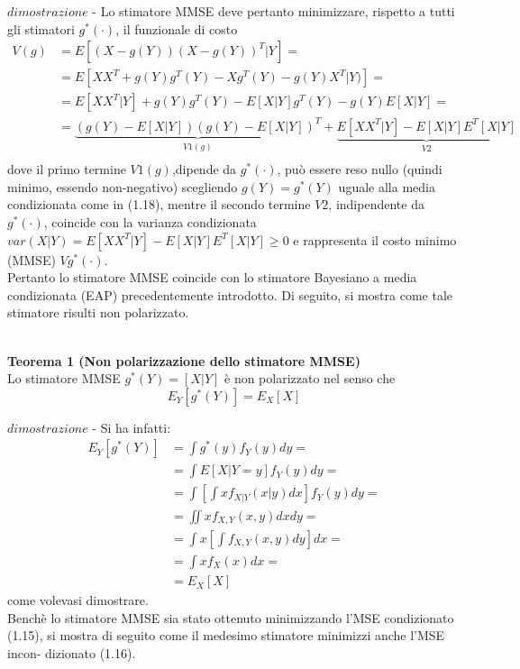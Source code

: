 $dimostrazione$ - Lo stimatore MMSE deve pertanto minimizzare, rispetto a tutti gli
stimatori $g^*(\cdot)$, il funzionale di costo\\
\begin{align}
V(g)&=E[(X-g(Y))(X-g(Y))^T|Y]= \nonumber\\
&=E[XX^T+g(Y)g^T(Y)-Xg^T(Y)-g(Y)X^T|Y)]= \nonumber\\
&=E[XX^T|Y]+g(Y)g^T(Y)-E[X|Y]g^T(Y)-g(Y)E[X|Y]=\nonumber\\
&=\underbrace{(g(Y)-E[X|Y])(g(Y)-E[X|Y])^T}_{V1(g)}+\underbrace{E[XX^T|Y]-E[X|Y]E^T[X|Y]}_{V2}\nonumber\\
\end{align}
dove il primo termine $V1(g)$,dipende da $g^*(\cdot)$, può essere reso nullo (quindi minimo, essendo non-negativo) scegliendo $g(Y)=g^*(Y)$ uguale alla media condizionata come in (1.18), mentre il secondo termine $V2$, indipendente da $g^*(\cdot)$, coincide con la varianza condizionata $var(X|Y)=E[XX^T|Y]-E[X|Y]E^T[X|Y]\ge 0 $ e rappresenta il costo minimo (MMSE) $Vg^*(\cdot)$.\\
Pertanto lo stimatore MMSE coincide con lo stimatore Bayesiano a media condizionata (EAP) precedentemente introdotto. Di seguito, si mostra come tale stimatore risulti non polarizzato.\\\\
\newpage

\textbf{Teorema 1 (Non polarizzazione dello stimatore MMSE)} \\
Lo stimatore MMSE $g^*(Y)=[X|Y]$ è non polarizzato nel senso che 
\begin{equation}
E_Y[g^*(Y)]=E_X[X] \nonumber
\end{equation}

$dimostrazione$ - Si ha infatti:
\begin{align}
E_Y[g^*(Y)]&=\int{ g^*(y)f_Y(y)dy}=\nonumber\\
 &=\int{ E[X|Y=y]f_Y(y)dy}=\nonumber\\
 &=\int{[\int xf_{X|Y}(x|y)dx]f_Y(y)dy}=\nonumber\\
&=\iint xf_{X,Y}(x,y)dxdy =\nonumber\\
&=\int x [\int f_{X,Y}(x,y)dy]dx=\nonumber\\
&=\int xf_X(x)dx = \nonumber\\
&=E_X[X]
\end{align}
come volevasi dimostrare.\\
Benchè lo stimatore MMSE sia stato ottenuto minimizzando l’MSE condizionato
(1.15), si mostra di seguito come il medesimo stimatore minimizzi anche l’MSE incon-
dizionato (1.16).
\newpage

